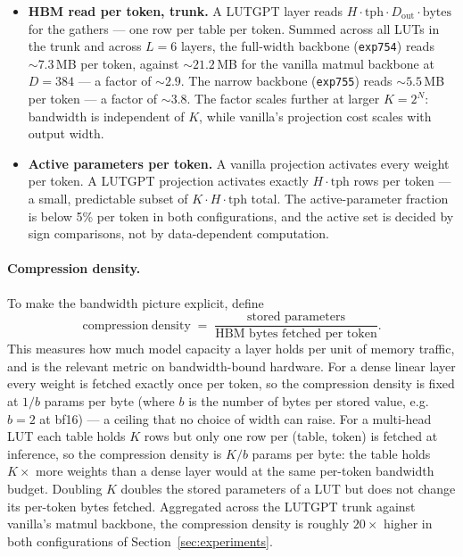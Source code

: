 \documentclass[11pt]{article}
\begin{document}
\begin{itemize}[leftmargin=*,topsep=2pt,itemsep=1pt]
\item \textbf{HBM read per token, trunk.} A LUTGPT layer reads $H \cdot \mathrm{tph} \cdot D_{\mathrm{out}} \cdot \mathrm{bytes}$ for the gathers --- one row per table per token. Summed across all LUTs in the trunk and across $L = 6$ layers, the full-width backbone (\texttt{exp754}) reads $\sim 7.3$\,MB per token, against $\sim 21.2$\,MB for the vanilla matmul backbone at $D = 384$ --- a factor of $\sim 2.9$. The narrow backbone (\texttt{exp755}) reads $\sim 5.5$\,MB per token --- a factor of $\sim 3.8$. The factor scales further at larger $K = 2^N$: bandwidth is independent of $K$, while vanilla's projection cost scales with output width.
\item \textbf{Active parameters per token.} A vanilla projection activates every weight per token. A LUTGPT projection activates exactly $H \cdot \mathrm{tph}$ rows per token --- a small, predictable subset of $K \cdot H \cdot \mathrm{tph}$ total. The active-parameter fraction is below 5\% per token in both configurations, and the active set is decided by sign comparisons, not by data-dependent computation.
\end{itemize}

\paragraph{Compression density.} To make the bandwidth picture explicit, define
\[
\mathrm{compression\ density} \;=\; \frac{\text{stored parameters}}{\text{HBM bytes fetched per token}}.
\]
This measures how much model capacity a layer holds per unit of memory traffic, and is the relevant metric on bandwidth-bound hardware. For a dense linear layer every weight is fetched exactly once per token, so the compression density is fixed at $1/b$ params per byte (where $b$ is the number of bytes per stored value, e.g.\ $b = 2$ at bf16) --- a ceiling that no choice of width can raise. For a multi-head LUT each table holds $K$ rows but only one row per (table, token) is fetched at inference, so the compression density is $K/b$ params per byte: the table holds $K \times$ more weights than a dense layer would at the same per-token bandwidth budget. Doubling $K$ doubles the stored parameters of a LUT but does not change its per-token bytes fetched. Aggregated across the LUTGPT trunk against vanilla's matmul backbone, the compression density is roughly $20\times$ higher in both configurations of Section~\ref{sec:experiments}.
\end{document}
